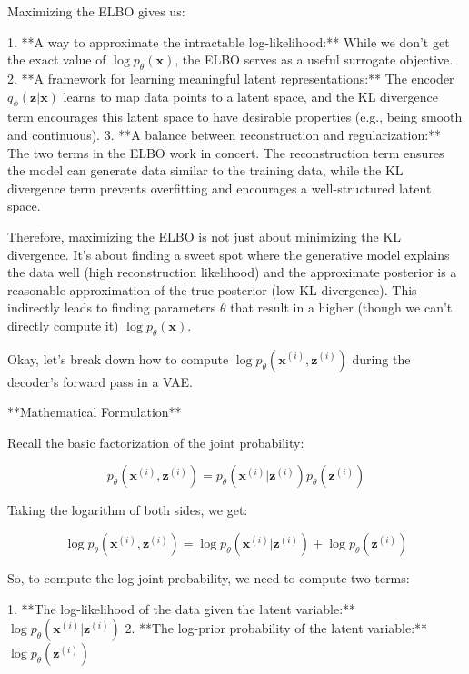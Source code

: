 \documentclass{article}
\begin{document}
Maximizing the ELBO gives us:

1. **A way to approximate the intractable log-likelihood:** While we don't get the exact value of $\log p_{\theta}(\mathbf{x})$, the ELBO serves as a useful surrogate objective.
2. **A framework for learning meaningful latent representations:** The encoder $q_{\phi}(\mathbf{z}|\mathbf{x})$ learns to map data points to a latent space, and the KL divergence term encourages this latent space to have desirable properties (e.g., being smooth and continuous).
3. **A balance between reconstruction and regularization:** The two terms in the ELBO work in concert. The reconstruction term ensures the model can generate data similar to the training data, while the KL divergence term prevents overfitting and encourages a well-structured latent space.

Therefore, maximizing the ELBO is not just about minimizing the KL divergence. It's about finding a sweet spot where the generative model explains the data well (high reconstruction likelihood) and the approximate posterior is a reasonable approximation of the true posterior (low KL divergence). This indirectly leads to finding parameters $\theta$ that result in a higher (though we can't directly compute it) $\log p_{\theta}(\mathbf{x})$.





\newpage

Okay, let's break down how to compute $\log p_{\theta}(\mathbf{x}^{(i)}, \mathbf{z}^{(i)})$ during the decoder's forward pass in a VAE.

**Mathematical Formulation**

Recall the basic factorization of the joint probability:

\[
p_{\theta}(\mathbf{x}^{(i)}, \mathbf{z}^{(i)}) = p_{\theta}(\mathbf{x}^{(i)} | \mathbf{z}^{(i)}) p_{\theta}(\mathbf{z}^{(i)})
\]

Taking the logarithm of both sides, we get:

\[
\log p_{\theta}(\mathbf{x}^{(i)}, \mathbf{z}^{(i)}) = \log p_{\theta}(\mathbf{x}^{(i)} | \mathbf{z}^{(i)}) + \log p_{\theta}(\mathbf{z}^{(i)})
\]

So, to compute the log-joint probability, we need to compute two terms:

1. **The log-likelihood of the data given the latent variable:** $\log p_{\theta}(\mathbf{x}^{(i)} | \mathbf{z}^{(i)})$
2. **The log-prior probability of the latent variable:** $\log p_{\theta}(\mathbf{z}^{(i)})$
\end{document}
